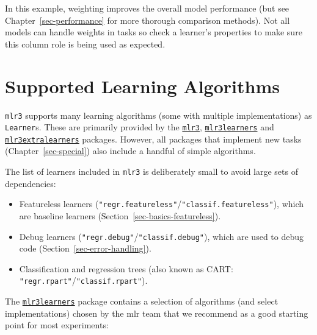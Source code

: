 In this example, weighting improves the overall model performance (but
see Chapter~\ref{sec-performance} for more thorough comparison methods).
Not all models can handle weights in tasks so check a learner's
properties to make sure this column role is being used as expected.

\hypertarget{sec-lrns-add}{%
\section{Supported Learning Algorithms}\label{sec-lrns-add}}

\texttt{mlr3} supports many learning algorithms (some with multiple
implementations) as \texttt{Learner}s. These are primarily provided by
the \href{https://mlr3.mlr-org.com}{\texttt{mlr3}},
\href{https://mlr3learners.mlr-org.com}{\texttt{mlr3learners}}
and
\href{https://mlr3extralearners.mlr-org.com}{\texttt{mlr3extralearners}}
packages. However, all packages that implement new tasks
(Chapter~\ref{sec-special}) also include a handful of simple algorithms.

The list of learners included in \texttt{mlr3} is deliberately small to
avoid large sets of dependencies:

\begin{itemize}
\tightlist
\item
  Featureless learners
  (\texttt{"regr.featureless"}/\texttt{"classif.featureless"}), which
  are baseline learners (Section~\ref{sec-basics-featureless}).
\item
  Debug learners (\texttt{"regr.debug"}/\texttt{"classif.debug"}), which
  are used to debug code (Section~\ref{sec-error-handling}).
\item
  Classification and regression trees (also known as CART:
  \texttt{"regr.rpart"}/\texttt{"classif.rpart"}).
\end{itemize}

The
\href{https://mlr3learners.mlr-org.com}{\texttt{mlr3learners}}
package contains a selection of algorithms (and select implementations)
chosen by the mlr team that we recommend as a good starting point for
most experiments:

